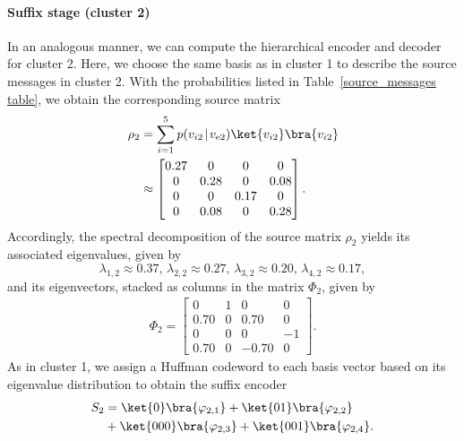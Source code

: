 \documentclass[conference]{IEEEtran}
\begin{document}
\paragraph{Suffix stage (cluster 2)}
In an analogous manner, we can compute the hierarchical encoder and decoder for cluster 2. Here, we choose the same basis as in cluster 1 to describe the source messages in cluster 2. With the probabilities listed in Table~\ref{source_messages table}, we obtain the corresponding source matrix
\begin{align*}   
\rho_2&=\sum_{i=1}^5 p(v_{i2}\!\mid\!v_{\mathrm e2})\ket{v_{i2}}\bra{v_{i2}} \\
&\approx
\begin{bmatrix}    
0.27 & 0 &  0 &  0 \\
0 & 0.28&  0&  0.08 \\
0 & 0&  0.17 &  0 \\
0 & 0.08 &  0&  0.28 
\end{bmatrix}.
\end{align*}
Accordingly, the spectral decomposition of the source matrix $\rho_2$ yields its associated eigenvalues, given by
\[
\lambda_{1,2}\approx0.37,\, \lambda_{2,2}\approx0.27,\, \lambda_{3,2}\approx0.20,\, \lambda_{4,2}\approx0.17,
\]
and its eigenvectors, stacked as columns in the matrix $\Phi_2$, given by
\begin{align*}
    \Phi_2=
    \begin{bmatrix}
    0 &  1 & 0 &  0 \\
    0.70 &   0 & 0.70 & 0 \\
    0 &   0 &  0 & -1 \\
    0.70 &   0 &  -0.70 &  0
\end{bmatrix}.
\end{align*}
As in cluster 1, we assign a Huffman codeword to each basis vector based on its eigenvalue distribution to obtain the suffix encoder
\begin{align*}    S_2&=\ket{0}\bra{\varphi_{2,1}}+\ket{01}\bra{\varphi_{2,2}} \\
&+\ket{000}\bra{\varphi_{2,3}}+\ket{001}\bra{\varphi_{2,4}}.
\end{align*}
\end{document}
